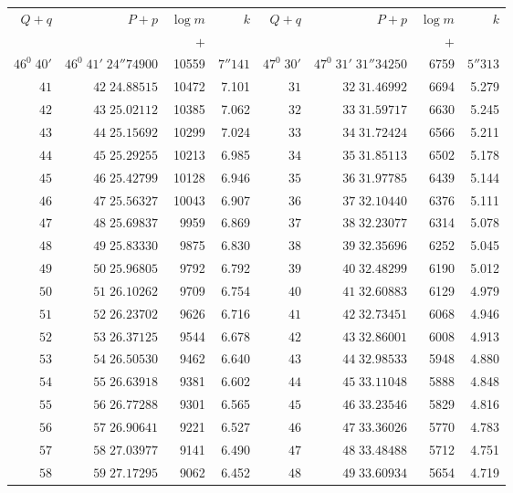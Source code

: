 \clearpage
{}
\begingroup
\fontsize{8}{9}\selectfont
\setlength{\tabcolsep}{3pt}
\renewcommand{\arraystretch}{1.08}
\begin{center}
\begin{tabular}{|r|r|r|r||r|r|r|r|}
\hline
\(Q+q\)&\(P+p\)&\(\log m\)&\(k\)&\(Q+q\)&\(P+p\)&\(\log m\)&\(k\)\\
&&\(+\)&&&&\(+\)&\\\hline
\(46^0\;40'\)&\(46^0\;41'\;24''74900\)&10559&\(7''141\)&\(47^0\;30'\)&\(47^0\;31'\;31''34250\)&6759&\(5''313\)\\
\(41\)&\(42\;24.88515\)&10472&7.101&\(31\)&\(32\;31.46992\)&6694&5.279\\
\(42\)&\(43\;25.02112\)&10385&7.062&\(32\)&\(33\;31.59717\)&6630&5.245\\
\(43\)&\(44\;25.15692\)&10299&7.024&\(33\)&\(34\;31.72424\)&6566&5.211\\
\(44\)&\(45\;25.29255\)&10213&6.985&\(34\)&\(35\;31.85113\)&6502&5.178\\
\(45\)&\(46\;25.42799\)&10128&6.946&\(35\)&\(36\;31.97785\)&6439&5.144\\
\(46\)&\(47\;25.56327\)&10043&6.907&\(36\)&\(37\;32.10440\)&6376&5.111\\
\(47\)&\(48\;25.69837\)&9959&6.869&\(37\)&\(38\;32.23077\)&6314&5.078\\
\(48\)&\(49\;25.83330\)&9875&6.830&\(38\)&\(39\;32.35696\)&6252&5.045\\
\(49\)&\(50\;25.96805\)&9792&6.792&\(39\)&\(40\;32.48299\)&6190&5.012\\[3pt]
\(50\)&\(51\;26.10262\)&9709&6.754&\(40\)&\(41\;32.60883\)&6129&4.979\\
\(51\)&\(52\;26.23702\)&9626&6.716&\(41\)&\(42\;32.73451\)&6068&4.946\\
\(52\)&\(53\;26.37125\)&9544&6.678&\(42\)&\(43\;32.86001\)&6008&4.913\\
\(53\)&\(54\;26.50530\)&9462&6.640&\(43\)&\(44\;32.98533\)&5948&4.880\\
\(54\)&\(55\;26.63918\)&9381&6.602&\(44\)&\(45\;33.11048\)&5888&4.848\\
\(55\)&\(56\;26.77288\)&9301&6.565&\(45\)&\(46\;33.23546\)&5829&4.816\\
\(56\)&\(57\;26.90641\)&9221&6.527&\(46\)&\(47\;33.36026\)&5770&4.783\\
\(57\)&\(58\;27.03977\)&9141&6.490&\(47\)&\(48\;33.48488\)&5712&4.751\\
\(58\)&\(59\;27.17295\)&9062&6.452&\(48\)&\(49\;33.60934\)&5654&4.719\\

\end{tabular}
\end{center}
